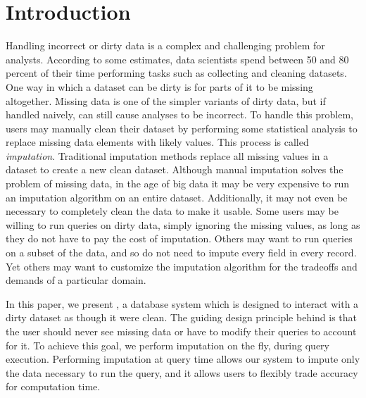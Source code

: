 \section{Introduction}

Handling incorrect or dirty data is a complex and challenging problem for analysts.
According to some estimates, data scientists spend between 50 and 80 percent of their
time performing tasks such as collecting and cleaning datasets\cite{data-science-cleaning}.
One way in which a dataset can be dirty is for parts of it to be missing altogether.
Missing data is one of the simpler variants of dirty data, but if handled naively, can still cause analyses to be incorrect.
To handle this problem, users may manually clean their dataset by performing
some statistical analysis to replace missing data elements with likely values.
This process is called \emph{imputation}.
Traditional imputation methods replace all missing values in a dataset to create a new clean dataset.
Although manual imputation solves the problem of missing data, in the age of big data it may be very expensive to run an imputation algorithm on an entire dataset.
Additionally, it may not even be necessary to completely clean the data to make it usable.
Some users may be willing to run queries on dirty data, simply ignoring the missing values, as long as they do not have to pay the cost of imputation.
Others may want to run queries on a subset of the data, and so do not need to impute
every field in every record. Yet others may want to customize the 
imputation algorithm for the tradeoffs and demands of a particular domain.

In this paper, we present \ProjectName{}, a database system which is designed to interact with a dirty dataset as though it were clean.
The guiding design principle behind \ProjectName{} is that the user should never see missing data or have to modify their queries to account for it.
To achieve this goal, we perform imputation on the fly, during query execution.
Performing imputation at query time allows our system to impute only the data necessary to run the query, and it allows users to flexibly trade accuracy for computation time.

